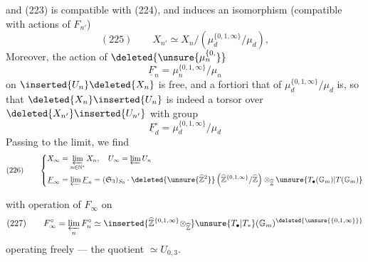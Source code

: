 and  (223) is compatible with (224), and induces an isomorphism (compatible with actions of $F_{n'}$)
\[
(225)\qquad X_{n'}\simeq X_n/(\mu_d^{\{0,1,\infty\}}/\mu_d),
\]
Moreover, the action of $\deleted{\unsure{\mu_n^{\{0,}}}$
\[
\underline F_n^{\circ}=\mu_n^{\{0,1,\infty\}}/\mu_n
\]
on $\inserted{U_n}\deleted{X_n}$ is free, and a fortiori that of $\mu_d^{\{0,1,\infty\}}/\mu_d$ is, so that $\deleted{X_n}\inserted{U_n}$ is indeed a torsor over $\deleted{X_{n'}}\inserted{U_{n'}}$ with group
\[
\underline F_d^{\circ}=\mu_d^{\{0,1,\infty\}}/\mu_d
\]
Passing to the limit, we find
\[
(226)\qquad\left\{\begin{aligned}
X_{\infty}&=\varprojlim_{n\in\mathbb N^{*}}X_n,\quad U_{\infty}=\varprojlim U_n\\
\underline F_{\infty}&=\varprojlim\underline F_n=(\mathfrak S_3)_{S_0}\mathbin{\cdot}\deleted{\unsure{\widehat{\mathbb Z}^{2}}}\left(\widehat{\mathbb Z}^{\{0,1,\infty\}}/\widehat{\mathbb Z}\right)\otimes_{\widehat{\mathbb Z}}\unsure{T_{\bullet}(\mathbb G_m)|T(\mathbb G_m)}
\end{aligned}\right.
\]



with operation of $F_\infty$ on 
\[
(227)\qquad F_\infty^\circ=\varprojlim_n F_n^\circ\simeq
\inserted{\widehat{\mathbb Z}^{\{0,1,\infty\}}\otimes_{\widehat{\mathbb Z}}}
\unsure{T_\bullet|T_*}(\mathbb G_m)^{\deleted{\unsure{\{0,1,\infty\}}}}
\]
operating freely  --- the quotient 
$\simeq U_{0,3}$.

